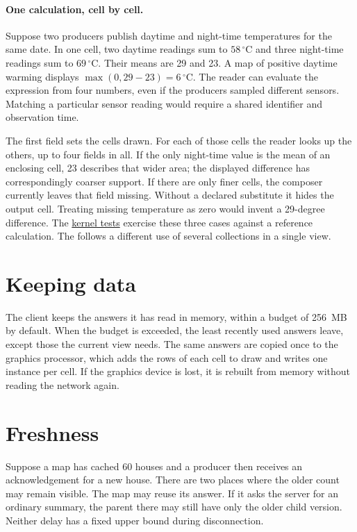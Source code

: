 \documentclass[11pt]{article}
\begin{document}
\paragraph{One calculation, cell by cell.}
Suppose two producers publish daytime and night-time temperatures for the same date. In one cell, two daytime readings sum to $58\,^{\circ}\mathrm{C}$ and three night-time readings sum to $69\,^{\circ}\mathrm{C}$. Their means are 29 and 23. A map of positive daytime warming displays $\max(0,29-23)=6\,^{\circ}\mathrm{C}$. The reader can evaluate the expression from four numbers, even if the producers sampled different sensors. Matching a particular sensor reading would require a shared identifier and observation time.

The first field sets the cells drawn. For each of those cells the reader looks up the others, up to four fields in all. If the only night-time value is the mean of an enclosing cell, 23 describes that wider area; the displayed difference has correspondingly coarser support. If there are only finer cells, the composer currently leaves that field missing. Without a declared substitute it hides the output cell. Treating missing temperature as zero would invent a 29-degree difference. The \href{https://github.com/indexus/sdk/blob/6e1bba2/src/gpu/combine.test.mjs}{kernel tests} exercise these three cases against a reference calculation. The  follows a different use of several collections in a single view.

\section{Keeping data}
The client keeps the answers it has read in memory, within a budget of 256~MB by default. When the budget is exceeded, the least recently used answers leave, except those the current view needs. The same answers are copied once to the graphics processor, which adds the rows of each cell to draw and writes one instance per cell. If the graphics device is lost, it is rebuilt from memory without reading the network again.

\section{Freshness}\label{sec:freshness}\hypertarget{ix:freshness}{}
Suppose a map has cached 60 houses and a producer then receives an acknowledgement for a new house. There are two places where the older count may remain visible. The map may reuse its answer. If it asks the server for an ordinary summary, the parent there may still have only the older child version. Neither delay has a fixed upper bound during disconnection.
\end{document}
